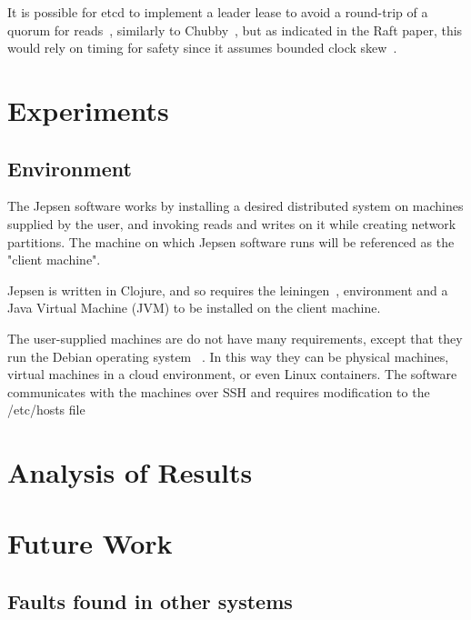 \documentclass[12pt,conference]{IEEEtran}
\begin{document}
It is possible for etcd to implement a leader lease to avoid a round-trip of a quorum for reads~\cite{gray1989leases}, similarly to Chubby~\cite{burrows2006chubby}, but as indicated in the Raft paper, this would rely on timing for safety since it assumes bounded clock skew~\cite{ongaro2014search}.

\section{Experiments}
\subsection {Environment}

The Jepsen software works by installing a desired distributed system on machines supplied by the user, and invoking reads and writes on it while creating network partitions. The machine on which Jepsen software runs will be referenced as the "client machine".

Jepsen is written in Clojure, and so requires the leiningen~\cite{leiningen}, environment and a Java Virtual Machine (JVM) to be installed on the client machine.

The user-supplied machines are do not have many requirements, except that they run the Debian operating system ~\cite{jepsenGithubWebsite}. In this way they can be physical machines, virtual machines in a cloud environment, or even Linux containers. The software communicates with the machines over SSH and requires modification to the /etc/hosts file


\section{Analysis of Results}

\section{Future Work}
\subsection{Faults found in other systems}
\end{document}
